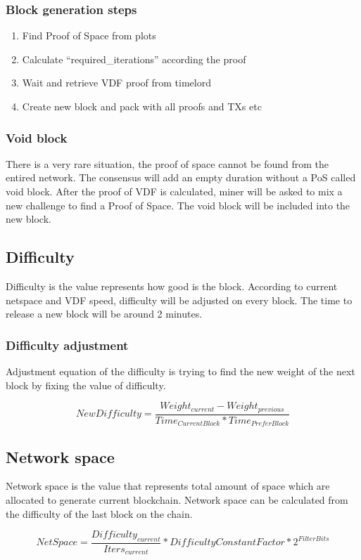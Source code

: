 \subsubsection{Block generation steps}
\begin{enumerate}
    \item Find Proof of Space from plots
    \item Calculate ``required\_iterations'' according the proof
    \item Wait and retrieve VDF proof from timelord
    \item Create new block and pack with all proofs and TXs etc
\end{enumerate}

\subsubsection{Void block}
\begin{flushleft}
    There is a very rare situation, the proof of space cannot be found from the entired network. The consensus will add an empty duration without a PoS called void block. After the proof of VDF is calculated, miner will be asked to mix a new challenge to find a Proof of Space. The void block will be included into the new block.
\end{flushleft}
\subsection{Difficulty}
\begin{flushleft}
    Difficulty is the value represents how good is the block. According to current netspace and VDF speed, difficulty will be adjusted on every block. The time to release a new block will be around 2 minutes.
\end{flushleft}
\subsubsection{Difficulty adjustment}
\begin{flushleft}
    Adjustment equation of the difficulty is trying to find the new weight of the next block by fixing the value of difficulty.
\end{flushleft}
\begin{equation}
    NewDifficulty = \frac{Weight_{current} - Weight_{previous}}{Time_{CurrentBlock} * Time_{PreferBlock}}
\end{equation}
\subsection{Network space}
\begin{flushleft}
    Network space is the value that represents total amount of space which are allocated to generate current blockchain. Network space can be calculated from the difficulty of the last block on the chain.
\end{flushleft}
\begin{equation}
    NetSpace = \frac{Difficulty_{current}}{Iters_{current}}*{DifficultyConstantFactor}*2^{FilterBits}
\end{equation}
